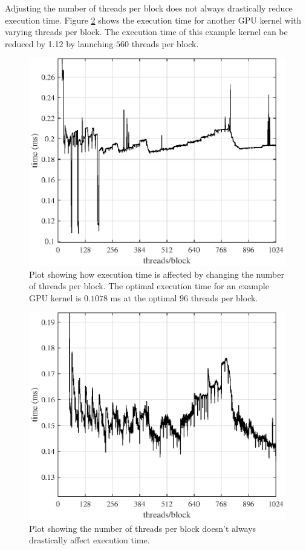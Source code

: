 Adjusting the number of threads per block does not always drastically reduce execution time.
Figure \ref{fig:ConvGPU_global_12672_186taps} shows the execution time for another GPU kernel with varying threads per block.
The execution time of this example kernel can be reduced by 1.12 by launching $560$ threads per block.
\begin{figure}
	\centering\includegraphics[width=5in]{figures/gpu_intro/ConvGPU_shared_12672_186taps.eps}
	\caption{Plot showing how execution time is affected by changing the number of threads per block.
	The optimal execution time for an example GPU kernel is $0.1078$ ms at the optimal $96$ threads per block.}
	\label{fig:ConvGPU_shared_12672_186taps}
\end{figure}
\begin{figure}
	\centering\includegraphics[width=5in]{figures/gpu_intro/ConvGPU_global_12672_186taps.eps}
	\caption{Plot showing the number of threads per block doesn't always drastically affect execution time.}
	\label{fig:ConvGPU_global_12672_186taps}
\end{figure}

